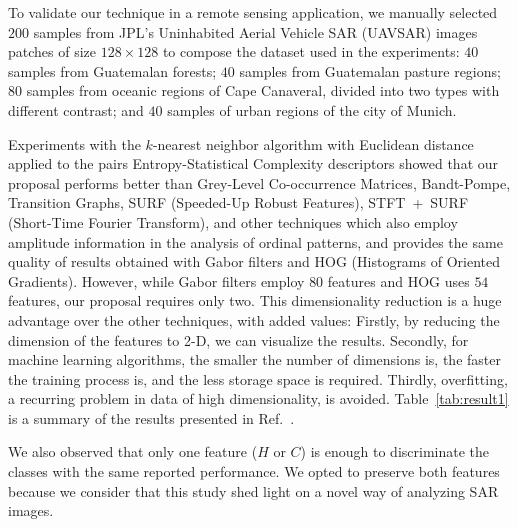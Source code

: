 \documentclass[a4,11pt]{pssbmac}
\begin{document}
To validate our technique in a remote sensing application, we manually selected $200$ samples from JPL's Uninhabited Aerial Vehicle SAR (UAVSAR) images patches of size $128 \times 128$ to compose the dataset used in the experiments:
$40$ samples from Guatemalan forests;
$40$ samples from Guatemalan pasture regions;
$80$ samples from oceanic regions of Cape Canaveral, divided into two types with different contrast; and
$40$ samples of urban regions of the city of Munich.

Experiments with the $k$-nearest neighbor algorithm with Euclidean distance applied to the pairs Entropy-Statistical Complexity descriptors showed that our proposal performs better than Grey-Level Co-occurrence Matrices, Bandt-Pompe, Transition Graphs, SURF (Speeded-Up Robust Features), \mbox{STFT + SURF} (Short-Time Fourier Transform), and other techniques which also employ amplitude information in the analysis of ordinal patterns, and provides the same quality of results obtained with Gabor filters and HOG (Histograms of Oriented Gradients).
However, while Gabor filters employ $80$ features and HOG uses $54$ features, our proposal requires only two.
This dimensionality reduction is a huge advantage over the other techniques, with added values:
Firstly, by reducing the dimension of the features to \mbox{2-D}, we can visualize the results.
Secondly, for machine learning algorithms, the smaller the number of dimensions is, the faster the training process is, and the less storage space is required.
Thirdly, overfitting, a recurring problem in data of high dimensionality, is avoided.
Table~\ref{tab:result1} is a summary of the results presented in Ref.~\cite{AnalysisandClassificationofSARTexturesUsingInformationTheory}.


We also observed that only one feature ($H$ or $C$) is enough to discriminate the classes with the same reported performance. 
We opted to preserve both features because we consider that this study shed light on a novel way of analyzing SAR images. 
\end{document}
